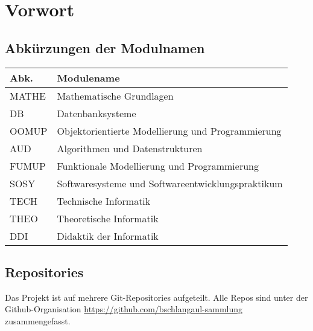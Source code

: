 \documentclass{bschlangaul-basis}
\begin{document}
\section{Vorwort}

%

\subsection{Abkürzungen der Modulnamen}

\begin{tabular}{|l|l|}
Abk.  & Modulename                                          \\\hline
MATHE & Mathematische Grundlagen                            \\
DB    & Datenbanksysteme                                    \\
OOMUP & Objektorientierte Modellierung und Programmierung   \\
AUD   & Algorithmen und Datenstrukturen                     \\
FUMUP & Funktionale Modellierung und Programmierung         \\
SOSY  & Softwaresysteme und Softwareentwicklungspraktikum   \\
TECH  & Technische Informatik                               \\
THEO  & Theoretische Informatik                             \\
DDI   & Didaktik der Informatik                             \\
\end{tabular}

%

\subsection{Repositories}

Das Projekt ist auf mehrere Git-Repositories aufgeteilt. Alle Repos
sind unter der Github-Organisation
\url{https://github.com/bschlangaul-sammlung} zusammengefasst.

\def\TmpRepo#1#2{\item[#1] \strut \par

{\footnotesize \url{https://github.com/bschlangaul-sammlung/#1}}

\par #2

}
\end{document}
